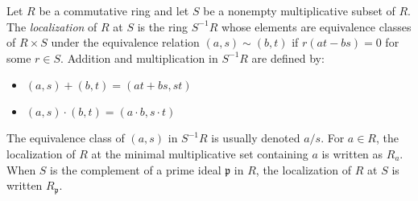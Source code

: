 \documentclass[12pt]{article}
\begin{document}
Let $R$ be a commutative ring and let $S$ be a nonempty multiplicative subset of $R$. The {\em localization} of $R$ at $S$ is the ring $S^{-1} R$ whose elements are equivalence classes of $R \times S$ under the equivalence relation $(a,s) \sim (b,t)$ if $r(at - bs) = 0$ for some $r \in S$. Addition and multiplication in $S^{-1}R$ are defined by:
\begin{itemize}
\item $(a,s) + (b,t) = (at+bs,st)$
\item $(a,s) \cdot (b,t) = (a \cdot b,s \cdot t)$
\end{itemize}
The equivalence class of $(a,s)$ in $S^{-1}R$ is usually denoted $a/s$. For $a \in R$, the localization of $R$ at the minimal multiplicative set containing $a$ is written as $R_a$. When $S$ is the complement of a prime ideal $\mathfrak{p}$ in $R$, the localization of $R$ at $S$ is written $R_{\mathfrak{p}}$.
\end{document}
